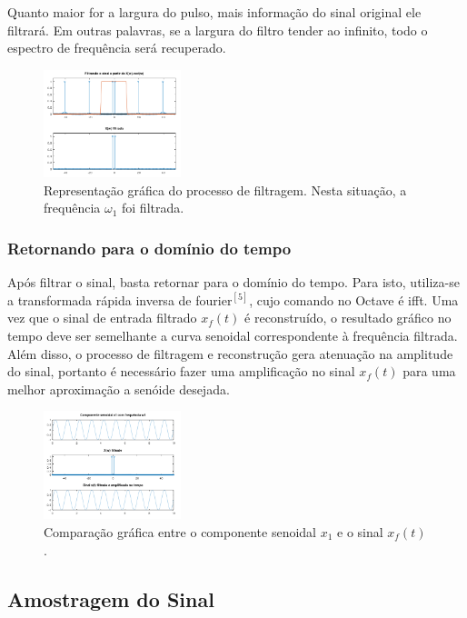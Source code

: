 \documentclass[]{IEEEtran}
\begin{document}
Quanto maior for a largura do pulso, mais informação do sinal original ele filtrará. Em outras palavras, se a largura do filtro tender ao infinito, todo o espectro de frequência será recuperado.

\begin{figure}[H]
\captionsetup{justification=centering}
\centering %
\includegraphics[width=4cm]{ex_filtrando.png} %
\caption{Representação gráfica do processo de filtragem. Nesta situação, a frequência $\omega$$_1$ foi filtrada.}
\end{figure}

\subsubsection{Retornando para o domínio do tempo}

Após filtrar o sinal, basta retornar para o domínio do tempo. Para isto, utiliza-se a transformada rápida inversa de fourier$^{[5]}$, cujo comando no Octave é {\selectfont ifft}. Uma vez que o sinal de entrada filtrado $x$$_f$$(t)$ é reconstruído, o resultado gráfico no tempo deve ser semelhante a curva senoidal correspondente à frequência filtrada. Além disso, o processo de filtragem e reconstrução gera atenuação na amplitude do sinal, portanto é necessário fazer uma amplificação no sinal $x$$_f$$(t)$ para uma melhor aproximação a senóide desejada.

\begin{figure}[H]
\captionsetup{justification=centering}
\centering %
\includegraphics[width=4cm]{ex_amplificando.png} %
\caption{Comparação gráfica entre o componente senoidal $x_1$ e o sinal $x$$_f$$(t)$.}
\end{figure}

\subsection{Amostragem do Sinal}
\end{document}
